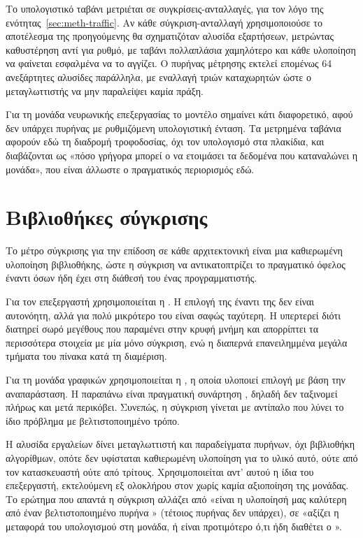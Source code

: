 Το υπολογιστικό ταβάνι μετριέται σε συγκρίσεις-ανταλλαγές, για τον λόγο της
ενότητας~\ref{sec:meth-traffic}. Αν κάθε σύγκριση-ανταλλαγή χρησιμοποιούσε το
αποτέλεσμα της προηγούμενης θα σχηματιζόταν αλυσίδα εξαρτήσεων, μετρώντας
καθυστέρηση αντί για ρυθμό, με ταβάνι πολλαπλάσια χαμηλότερο και κάθε υλοποίηση
να φαίνεται εσφαλμένα να το αγγίζει. Ο πυρήνας μέτρησης εκτελεί επομένως 64
ανεξάρτητες αλυσίδες παράλληλα, με εναλλαγή τριών καταχωρητών ώστε ο
μεταγλωττιστής να μην παραλείψει καμία πράξη.

Για τη μονάδα νευρωνικής επεξεργασίας το μοντέλο σημαίνει κάτι διαφορετικό,
αφού δεν υπάρχει πυρήνας  με ρυθμιζόμενη υπολογιστική ένταση. Τα
μετρημένα ταβάνια αφορούν εδώ τη διαδρομή τροφοδοσίας, όχι τον υπολογισμό στα
πλακίδια, και διαβάζονται ως «πόσο γρήγορα μπορεί ο  να ετοιμάσει τα
δεδομένα που καταναλώνει η μονάδα», που είναι άλλωστε ο πραγματικός περιορισμός
εδώ.

\section{Βιβλιοθήκες σύγκρισης}
\label{sec:meth-baseline-libraries}

Το μέτρο σύγκρισης για την επίδοση σε κάθε αρχιτεκτονική είναι μια καθιερωμένη
υλοποίηση βιβλιοθήκης, ώστε η σύγκριση να αντικατοπτρίζει το πραγματικό όφελος
έναντι όσων ήδη έχει στη διάθεσή του ένας προγραμματιστής.

Για τον επεξεργαστή χρησιμοποιείται η . Η επιλογή της
έναντι της  δεν είναι αυτονόητη, αλλά για  πολύ
μικρότερο του  είναι σαφώς ταχύτερη. Η  υπερτερεί
διότι διατηρεί σωρό μεγέθους  που παραμένει στην κρυφή μνήμη και
απορρίπτει τα περισσότερα στοιχεία με μία μόνο σύγκριση, ενώ η
 διαπερνά επανειλημμένα μεγάλα τμήματα του πίνακα κατά τη
διαμέριση.

Για τη μονάδα γραφικών χρησιμοποιείται η , η οποία υλοποιεί
επιλογή με βάση την αναπαράσταση. Η παραπάνω είναι πραγματική συνάρτηση
, δηλαδή δεν ταξινομεί πλήρως και μετά περικόβει. Συνεπώς, η σύγκριση
γίνεται με αντίπαλο που λύνει το ίδιο πρόβλημα με βελτιστοποιημένο τρόπο.

Η αλυσίδα εργαλείων  δίνει μεταγλωττιστή και παραδείγματα πυρήνων, όχι
βιβλιοθήκη αλγορίθμων, οπότε δεν υφίσταται καθιερωμένη υλοποίηση  για
το υλικό αυτό, ούτε από τον κατασκευαστή ούτε από τρίτους. Χρησιμοποιείται αντ'
αυτού η ίδια  του επεξεργαστή, εκτελούμενη εξ ολοκλήρου
στον  χωρίς καμία αξιοποίηση της μονάδας. Το ερώτημα που απαντά η
σύγκριση αλλάζει από «είναι η υλοποίησή μας καλύτερη από έναν βελτιστοποιημένο
πυρήνα » (τέτοιος πυρήνας δεν υπάρχει), σε «αξίζει η μεταφορά του
υπολογισμού στη μονάδα, ή είναι προτιμότερο ό,τι ήδη διαθέτει ο ».

